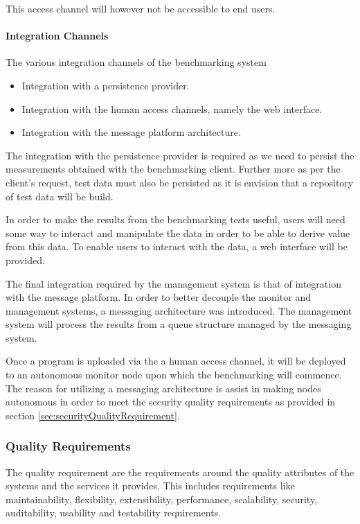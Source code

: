 This access channel will however not be accessible to end users.

\paragraph*{Integration Channels}
The various integration channels of the benchmarking system
\begin{itemize}
	\item Integration with a persistence provider.
	\item Integration with the human access channels, namely the web interface.
	\item Integration with the message platform architecture.
\end{itemize}

The integration with the persistence provider is required as we need to persist
the measurements obtained with the benchmarking client. Further more as per the
client's request, test data must also be persisted as it is envision that a
repository of test data will be build.

In order to make the results from the benchmarking tests useful, users will
need some way to interact and manipulate the data in order to be able to
derive value from this data. To enable users to interact with the data,
a web interface will be provided.

The final integration required by the management system is that of integration
with the message platform. In order to better decouple the monitor and
management systems, a messaging architecture was introduced. The management
system will process the results from a queue structure managed by the messaging
system. 

Once a program is uploaded via the a human access channel, it will be deployed
to an autonomous monitor node upon which the benchmarking will commence.  The 
reason for utilizing a messaging architecture is assist in making nodes autonomous
in order to meet the security quality requirements as provided in
section \ref{sec:securityQualityRequirement}.

\subsubsection{Quality Requirements}
\label{sec:qualityRequirementManagementSystem}
The quality requirement are the requirements around the quality attributes of
the systems and the services it provides. This includes requirements like
maintainability, flexibility, extensibility, performance, scalability, security,
auditability, usability and testability requirements.


